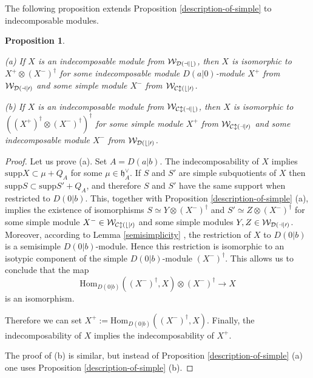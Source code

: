 \documentclass[12pt]{amsart}
\makeatletter
\def\mathcal{\cal}
\def\@putname#1#2#3#4{\def\@@ref{#3}\let\old@bf\bf
        \def\bf##1{\old@bf\if?\noexpand##1?{#4}\else##1\fi}%
	#1{#2}%
        \let\bf\old@bf}
\def\@putname#1#2#3#4{\def\@@ref{#3}\let\old@bf\bf	%
	\let\old@reset@font\reset@font			%
        \def\bf##1{\old@bf\if?\noexpand##1?{#4}\else##1\fi}%
	\def\reset@font##1##2{\old@reset@font##1\if?\noexpand##2?{#4}\else##2\fi}#1{#2}%
        \let\bf\old@bf\let\reset@font\old@reset@font}
\let\my@ref=\ref
\def\ref#1{\@putname\my@ref{#1}{#1}{\tiny\rm\@@ref}}
\theoremstyle{plain} %
\numberwithin{equation}{section}
\theoremstyle{definition}
\theoremstyle{remark}
\theoremstyle{plain} %
\newtheorem{proposition}[definition]{Proposition}
\newcommand{\cW}{\mathcal{W}}
\newcommand{\Hom}{\mathrm{Hom}}
\newcommand{\supp}{\mathrm{supp}}
\newcommand{\gh}{\mathfrak{h}}
\def\gh{\mathfrak{h}}
\makeatother
\begin{document}
    The following proposition extends Proposition \ref{description-of-simple} to indecomposable modules. 
 \begin{proposition}\label{indecomposable-Cl}

        (a)        If $X$ is an indecomposable  module  from $\cW_{D(a|b)}$, then $X$ is isomorphic to $X^+\otimes (X^-)^\dagger$ for some indecomposable module $D(a|0)$-module
        $X^+$ from $\cW_{D(a|0)}$ and some simple module $X^-$ from $\cW_{Cl(b|0)}$. 
        
        (b) If $X$ is an indecomposable module from  $\cW_{Cl(a|b)}$, then $X$ is isomorphic to $((X^+)^\dagger\otimes (X^-)^\dagger)^\dagger$ for some
        simple module $X^+$ from $\cW_{Cl(a|0)}$
        and some indecomposable 
module $X^-$  from $\cW_{D(b|0)}$. 
      \end{proposition}
      \begin{proof} Let us prove (a). Set $A = D(a|b)$. The indecomposability of  $X$ implies $\supp X\subset\mu+Q_A$ for some $\mu \in \gh_A^{\vee}$. If
        $S$ and $S'$ are simple subquotients of $X$ then $\supp S\subset \supp S'+Q_A$, and therefore $S$ and $S'$ have the same support when restricted to
        $D(0|b)$. This, together with Proposition \ref{description-of-simple}(a),
        implies the existence of isomorphisms $S\simeq Y\otimes (X^-)^\dagger$ and $S'\simeq Z\otimes (X^-)^\dagger$ for some simple   module $X^-\in\cW_{Cl(b|0)}$ and some simple modules   $Y,Z\in\cW_{D(a|0)}$.  Moreover, according to Lemma \ref{semisimplicity},  the restriction of $X$ to $D(0|b)$ is a semisimple $D(0|b)$-module. Hence this restriction is isomorphic to an isotypic component of the simple $D(0|b)$-module $(X^-)^\dagger$. This allows us to conclude that the map 
        $$\Hom_{D(0|b)}((X^-)^\dagger,X) \otimes (X^-)^\dagger \to X$$
        is an isomorphism. 
        
        Therefore we can set $X^+ :=\Hom_{D(0|b)}((X^-)^\dagger,X)$. Finally, the  indecomposability of $X$ implies the indecomposability of $X^+$.

        The proof of (b) is similar, but instead of Proposition \ref{description-of-simple}(a) one uses Proposition \ref{description-of-simple}(b). 
      \end{proof}
      
\end{document}

